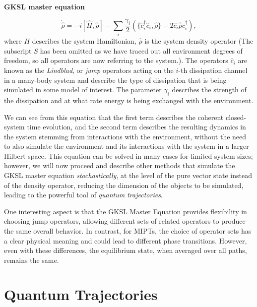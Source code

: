 \textbf{GKSL master equation}

\begin{equation}
\label{eq:GKSL_meq}
    \dot{\hat{\rho}} = -i [\hat{H}, \hat{\rho}] - \sum_i \frac{\gamma_i}{2} ( \{ \hat{c}^\dagger_i \hat{c}_i, \hat{\rho} \} - 2 \hat{c}_i \hat{\rho} \hat{c}^\dagger_i), 
\end{equation}
where $H$ describes the system Hamiltonian, $\hat{\rho}$ is the system density operator (The subscript \textit{S} has been omitted as we have traced out all environment degrees of freedom, so all operators are now referring to the system.). The operators $\hat{c}_i$ are known as the \textit{Lindblad}, or \textit{jump} operators acting on the $i$-th dissipation channel in a many-body system and describe the type of dissipation that is being simulated in some model of interest. The parameter $\gamma_i$ describes the strength of the dissipation and at what rate energy is being exchanged with the environment. 

We can see from this equation that the first term describes the coherent closed-system time evolution, and the second term describes the resulting dynamics in the system stemming from interactions with the environment, without the need to also simulate the environment and its interactions with the system in a larger Hilbert space. This equation can be solved in many cases for limited system sizes; however, we will now proceed and describe other methods that simulate the GKSL master equation \textit{stochastically}, at the level of the pure vector state instead of the density operator, reducing the dimension of the objects to be simulated, leading to the powerful tool of \textit{quantum trajectories}.

One interesting aspect is that the GKSL Master Equation provides flexibility in choosing jump operators, allowing different sets of related operators to produce the same overall behavior. In contrast, for MIPTs, the choice of operator sets has a clear physical meaning and could lead to different phase transitions. However, even with these differences, the equilibrium state, when averaged over all paths, remains the same.

\section{Quantum Trajectories}

